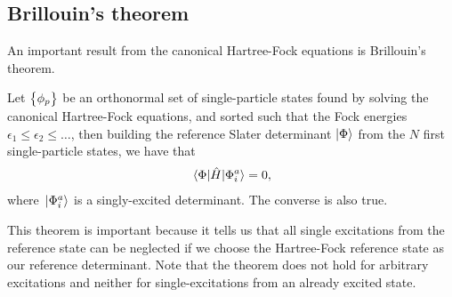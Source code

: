         \subsection{Brillouin's theorem}
            An important result from the canonical Hartree-Fock equations is
            Brillouin's theorem.
            \begin{theorem}
                \label{theorem:brillouin}
                Let $\left\{ \phi_p \right\}$ be an orthonormal set of single-particle
                states found by solving the canonical Hartree-Fock equations,
                and sorted such that the Fock energies $\epsilon_1 \leq
                \epsilon_2 \leq \dots$, then building the reference Slater
                determinant $\ket{\Phi}$ from the $N$ first single-particle
                states, we have that
                \begin{align}
                    \mel*{\Phi}{\hat{H}}{\Phi^{a}_{i}} = 0,
                \end{align}
                where $\ket*{\Phi^{a}_{i}}$ is a singly-excited determinant.
                The converse is also true.
            \end{theorem}
            This theorem is important because it tells us that all single
            excitations from the reference state can be neglected if we choose
            the Hartree-Fock reference state as our reference determinant.
            Note that the theorem does not hold for arbitrary excitations and
            neither for single-excitations from an already excited state.
